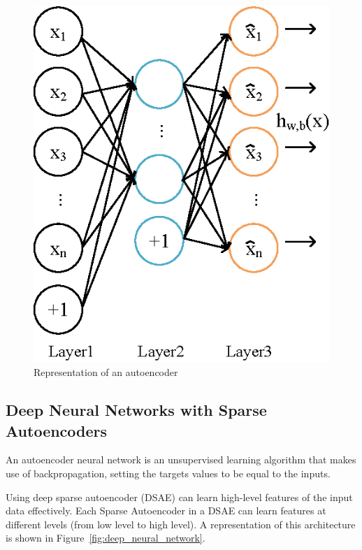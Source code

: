 \documentclass{comjnl}
\begin{document}
\begin{figure}
\centering
\includegraphics[width=0.58\linewidth]{figures/autoencoder.eps}
\caption{Representation of an autoencoder~\cite{Ng01}}
\label{fig:autoencoder}
\end{figure}

\subsection{Deep Neural Networks with Sparse Autoencoders}
An autoencoder neural network is an unsupervised learning algorithm
that makes use of backpropagation, setting the targets values to be
equal to the inputs.

Using deep sparse autoencoder (DSAE) can learn high-level features
of the input data effectively. Each Sparse Autoencoder in a DSAE can
learn features at different levels (from low level to high level). A
representation of this architecture is shown in
Figure~\ref{fig:deep_neural_network}.
\end{document}
